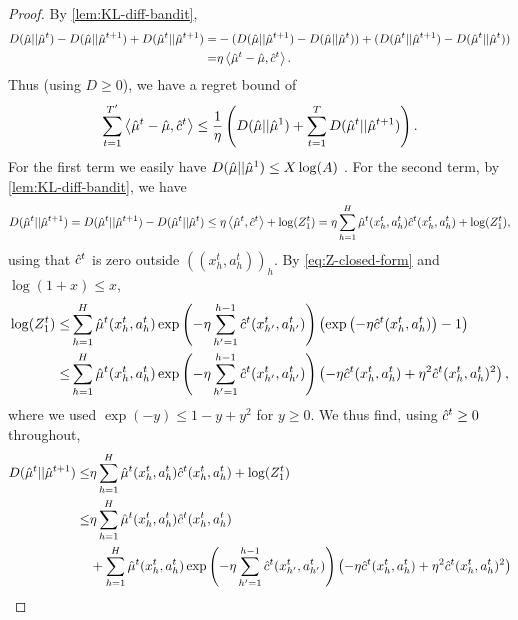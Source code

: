 \begin{proof}
    By \cref{lem:KL-diff-bandit}, 
    \begin{align*}
        D(\hat{\mu}||\hat{\mu}^t) - D(\hat{\mu}||\hat{\mu}^{t+1}) + D(\hat{\mu}^t||\hat{\mu}^{t+1}) =& -(D(\hat{\mu}||\hat{\mu}^{t+1})-D(\hat{\mu}||\hat{\mu}^t)) + (D(\hat{\mu}^t||\hat{\mu}^{t+1})-D(\hat{\mu}^t||\hat{\mu}^t))\\
        =& \eta \left\langle \hat{\mu}^t-\hat{\mu}, \hat{c}^t \right\rangle.
    \end{align*}
    Thus (using $D\geq 0$), we have a regret bound of
    \begin{align*}
        \sum_{t=1}^{T'} \left\langle \hat{\mu}^t-\hat{\mu}, \hat{c}^t \right\rangle \leq \frac{1}{\eta} \left( D(\hat{\mu}||\hat{\mu}^1) + \sum_{t=1}^T D(\hat{\mu}^t||\hat{\mu}^{t+1}) \right).
    \end{align*}
     For the first term we easily have $D(\hat{\mu}||\hat{\mu}^1) \leq X\log(A)$ \citep[Lemma 6]{kozuno2021model}. For the second term, by \cref{lem:KL-diff-bandit}, we have
     \begin{align*}
         D(\hat{\mu}^t||\hat{\mu}^{t+1}) = D(\hat{\mu}^t||\hat{\mu}^{t+1}) - D(\hat{\mu}^t||\hat{\mu}^t)
         \leq \eta\left\langle \hat{\mu}^t, \hat{c}^t \right\rangle + \log(Z_1^t)= \eta\sum_{h=1}^H\hat{\mu}^t(x_h^t,a_h^t)\hat{c}^t(x_h^t,a_h^t) + \log(Z_1^t),
     \end{align*}
     using that $\hat{c}^t$ is zero outside $((x_h^t,a_h^t))_h$. By \cref{eq:Z-closed-form} and $\log(1+x)\leq x$,
     \begin{align*}
         \log(Z_1^t) \leq& \sum_{h=1}^H \hat{\mu}^t(x_{h}^t,a_{h}^t)\exp\left( -\eta \sum_{h'=1}^{h-1} \hat{c}^t(x_{h'}^t,a_{h'}^t) \right) \left( \exp\left( -\eta\hat{c}^t(x_{h}^t,a_{h}^t) \right) - 1 \right) \\
         \leq& \sum_{h=1}^H \hat{\mu}^t(x_{h}^t,a_{h}^t)\exp\left( -\eta \sum_{h'=1}^{h-1} \hat{c}^t(x_{h'}^t,a_{h'}^t) \right) \left( -\eta\hat{c}^t(x_{h}^t,a_{h}^t)+\eta^2\hat{c}^t(x_{h}^t,a_{h}^t)^2 \right),
     \end{align*}
     where we used $\exp(-y)\leq 1-y+y^2$ for $y\geq 0$. We thus find, using $\hat{c}^t\geq0$ throughout,
     \begin{align*}
         D(\muHat^t||\muHat^{t+1})\leq& \eta\sum_{h=1}^H\muHat^t(x_h^t,a_h^t)\cHat^t(x_h^t,a_h^t) + \log(Z_1^t)\\
         \leq& \eta\sum_{h=1}^H\muHat^t(x_h^t,a_h^t)\cHat^t(x_h^t,a_h^t) \\
         &+\sum_{h=1}^H \muHat^t(x_{h}^t,a_{h}^t)\exp\round{-\eta \sum_{h'=1}^{h-1} \cHat^t(x_{h'}^t,a_{h'}^t)} \round{-\eta\cHat^t(x_{h}^t,a_{h}^t)+\eta^2\cHat^t(x_{h}^t,a_{h}^t)^2}\\

\end{align*}
\end{proof}
